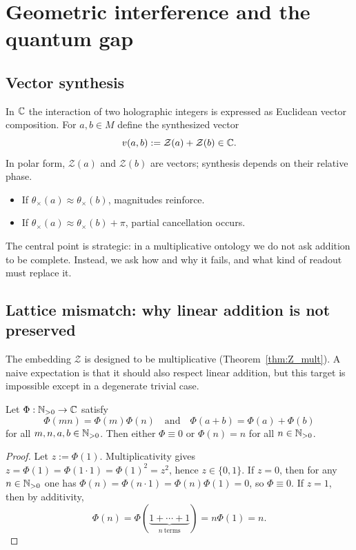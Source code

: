 \section{Geometric interference and the quantum gap}
\label{sec:interference}

\subsection{Vector synthesis}
In $\mathbb{C}$ the interaction of two holographic integers is expressed as Euclidean vector composition. For $a,b\in M$ define the synthesized vector
$$
v(a,b):=\mathcal{Z}(a)+\mathcal{Z}(b)\in\mathbb{C}.
$$
In polar form, $\mathcal{Z}(a)$ and $\mathcal{Z}(b)$ are vectors; synthesis depends on their relative phase.

\begin{itemize}
    \item If $\theta_\times(a)\approx\theta_\times(b)$, magnitudes reinforce.
    \item If $\theta_\times(a)\approx\theta_\times(b)+\pi$, partial cancellation occurs.
\end{itemize}

The central point is strategic: in a multiplicative ontology we do not ask addition to be complete. Instead, we ask how and why it fails, and what kind of readout must replace it.

\subsection{Lattice mismatch: why linear addition is not preserved}
The embedding $\mathcal{Z}$ is designed to be multiplicative (Theorem~\ref{thm:Z_mult}). A naive expectation is that it should also respect linear addition, but this target is impossible except in a degenerate trivial case.

\begin{theorem}
\label{thm:no_go_additive}
Let $\Phi:\mathbb{N}_{>0}\to\mathbb{C}$ satisfy
$$
\Phi(mn)=\Phi(m)\Phi(n)
\quad\text{and}\quad
\Phi(a+b)=\Phi(a)+\Phi(b)
$$
for all $m,n,a,b\in\mathbb{N}_{>0}$. Then either $\Phi\equiv 0$ or $\Phi(n)=n$ for all $n\in\mathbb{N}_{>0}$.
\end{theorem}

\begin{proof}
Let $z:=\Phi(1)$. Multiplicativity gives $z=\Phi(1)=\Phi(1\cdot 1)=\Phi(1)^2=z^2$, hence $z\in\{0,1\}$.
If $z=0$, then for any $n\in\mathbb{N}_{>0}$ one has $\Phi(n)=\Phi(n\cdot 1)=\Phi(n)\Phi(1)=0$, so $\Phi\equiv 0$.
If $z=1$, then by additivity,
$$
\Phi(n)=\Phi(\underbrace{1+\cdots+1}_{n\ \text{terms}})=n\Phi(1)=n.
$$
\end{proof}

